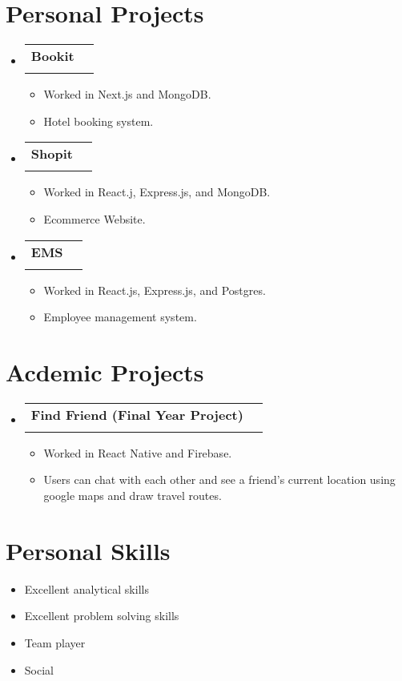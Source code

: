 \documentclass[letterpaper,11pt]{article}
\makeatletter
\newcommand{\resumeItem}[1]{
  \item\small{
    {#1 \vspace{-2pt}}
  }
}
\newcommand{\resumeSubheading}[4]{
  \vspace{-1pt}\item
    \begin{tabular*}{0.97\textwidth}[t]{l@{\extracolsep{\fill}}r}
      \textbf{#1} & #2 \\
      \textit{\small#3} & \textit{\small #4} \\
    \end{tabular*}\vspace{-6pt}
}
\newcommand{\resumeSubHeadingListStart}{\begin{itemize}[leftmargin=0.15in, label={}]}
\newcommand{\resumeSubHeadingListEnd}{\end{itemize}}
\newcommand{\resumeItemListStart}{\begin{itemize}}
\newcommand{\resumeItemListEnd}{\end{itemize}\vspace{-4pt}}
\makeatother
\begin{document}
\section{Personal Projects}
  \resumeSubHeadingListStart
      \resumeSubheading
      {Bookit}{}{}{}\vspace{-12pt}
      \resumeItemListStart
        \resumeItem{Worked in Next.js and MongoDB.}
        \resumeItem{Hotel booking system.}
    \resumeItemListEnd
    \resumeSubheading
    {Shopit}{}{}{}\vspace{-12pt}
      \resumeItemListStart
        \resumeItem{Worked in React.j, Express.js, and MongoDB.}
        \resumeItem{Ecommerce Website.}
    \resumeItemListEnd
    \resumeSubheading
    {EMS}{}{}{}\vspace{-12pt}
      \resumeItemListStart
        \resumeItem{Worked in React.js, Express.js, and Postgres.}
        \resumeItem{Employee management system.}
    \resumeItemListEnd
  \resumeSubHeadingListEnd

\section{Acdemic Projects}
  \resumeSubHeadingListStart
      \resumeSubheading
      {Find Friend (Final Year Project)}{}{}{}\vspace{-12pt}
      \resumeItemListStart
        \resumeItem{Worked in React Native and Firebase.}
        \resumeItem{Users can chat with each other and see a friend's current location using google maps and draw travel routes.}
    \resumeItemListEnd
  \resumeSubHeadingListEnd

\section{Personal Skills}
      \resumeItemListStart
        \resumeItem{Excellent analytical skills}
        \resumeItem{Excellent problem solving skills}
        \resumeItem{Team player}
        \resumeItem{Social}\vspace{-10pt}
    \resumeItemListEnd

\end{document}
